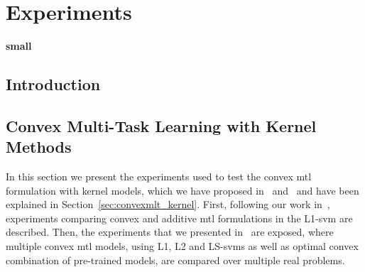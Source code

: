 
\chapter{Experiments} %
\label{Chapter6}

{\bf \small{
small  }}

\section{Introduction}



\section{Convex Multi-Task Learning with Kernel Methods}\label{sec:convexmtlsvm_exp}
In this section we present the experiments used to test the convex \acrshort{mtl} formulation with kernel models, which we have proposed in~\citep{RuizAD19} and~\citep{RuizAD21} and have been explained in Section~\ref{sec:convexmlt_kernel}. 
%
First, following our work in~\citep{RuizAD19}, experiments comparing convex and additive \acrshort{mtl} formulations in the L1-\acrshort{svm} are described. 
%
Then, the experiments that we presented in~\citep{RuizAD21} are exposed, where multiple convex \acrshort{mtl} models, using L1, L2 and LS-\acrshort{svm}s as well as optimal convex combination of pre-trained models, are compared over multiple real problems.

